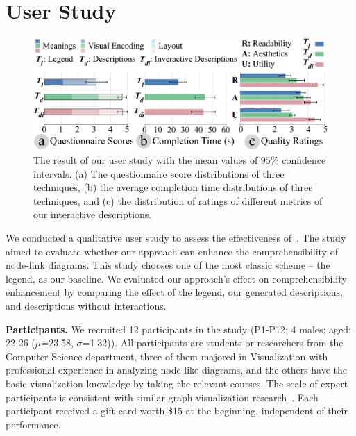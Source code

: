 \section{User Study}

\begin{figure}[tp]
    \centering
    \setlength{\belowcaptionskip}{-25pt}
    \includegraphics[width=1\columnwidth]{figures/UserStudy.eps}
    \caption{The result of our user study with the mean values of $95\%$ confidence intervals. (a) The questionnaire score distributions of three techniques, (b) the average completion time distributions of three techniques, and (c) the distribution of ratings of different metrics of our interactive descriptions. }
    \label{fig:UserStudy}
\end{figure}


We conducted a qualitative user study to assess the effectiveness of~\ApproachName. The study aimed to evaluate whether our approach can enhance the comprehensibility of node-link diagrams. This study chooses one of the most classic scheme -- the legend, as our baseline. We evaluated our approach's effect on comprehensibility enhancement by comparing the effect of the legend, our generated descriptions, and descriptions without interactions.


\textbf{Participants.}
We recruited 12 participants in the study (P1-P12; 4 males; aged: 22-26 ($\mu$=23.58, $\sigma$=1.32)). All participants are students or researchers from the Computer Science department, three of them majored in Visualization with professional experience in analyzing node-like diagrams, and the others have the basic visualization knowledge by taking the relevant courses. The scale of expert participants is consistent with similar graph visualization research~\cite{DBLP:journals/tvcg/BehrischSP20, DBLP:journals/tvcg/YoghourdjianDKM18}. Each participant received a gift card worth \$15 at the beginning, independent of their performance.


